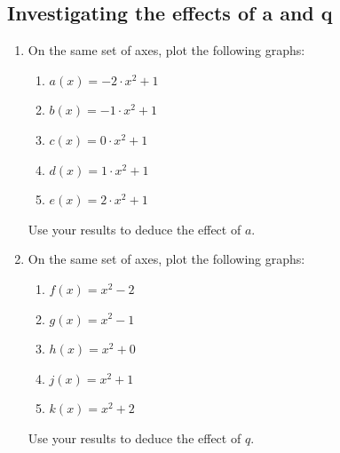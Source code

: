             \subsection{  Investigating the effects of a and q }
            \nopagebreak
        \label{m39345*id240398}\begin{enumerate}[noitemsep, label=\textbf{\arabic*}. ] 
            \label{m39345*uid103}\item On the same set of axes, plot the following graphs:
\label{m39345*id240413}\begin{enumerate}[noitemsep, label=\textbf{\alph*}. ] 
            \label{m39345*uid104}\item $a\left(x\right)=-2\ensuremath{\cdot}{x}^{2}+1$\label{m39345*uid105}\item $b\left(x\right)=-1\ensuremath{\cdot}{x}^{2}+1$\label{m39345*uid106}\item $c\left(x\right)=0\ensuremath{\cdot}{x}^{2}+1$\label{m39345*uid107}\item $d\left(x\right)=1\ensuremath{\cdot}{x}^{2}+1$\label{m39345*uid108}\item $e\left(x\right)=2\ensuremath{\cdot}{x}^{2}+1$\end{enumerate}
Use your results to deduce the effect of $a$.
\label{m39345*uid109}\item On the same set of axes, plot the following graphs:
\label{m39345*id240675}\begin{enumerate}[noitemsep, label=\textbf{\alph*}. ] 
            \label{m39345*uid110}\item $f\left(x\right)={x}^{2}-2$\label{m39345*uid111}\item $g\left(x\right)={x}^{2}-1$\label{m39345*uid112}\item $h\left(x\right)={x}^{2}+0$\label{m39345*uid113}\item $j\left(x\right)={x}^{2}+1$\label{m39345*uid114}\item $k\left(x\right)={x}^{2}+2$\end{enumerate}
Use your results to deduce the effect of $q$.
\end{enumerate}
